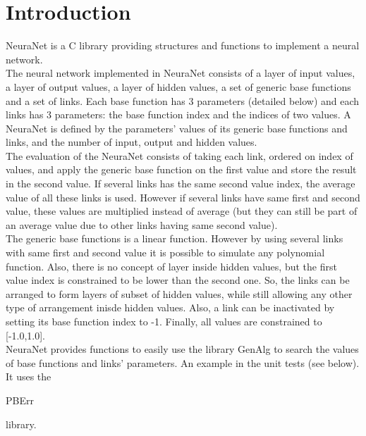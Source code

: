 \section*{Introduction}

NeuraNet is a C library providing structures and functions to implement a neural network.\\ 

The neural network implemented in NeuraNet consists of a layer of input values, a layer of output values, a layer of hidden values, a set of generic base functions and a set of links. Each base function has 3 parameters (detailed below) and each links has 3 parameters: the base function index and the indices of two values. A NeuraNet is defined by the parameters' values of its generic base functions and links, and the number of input, output and hidden values.\\

The evaluation of the NeuraNet consists of taking each link, ordered on index of values, and apply the generic base function on the first value and store the result in the second value. If several links has the same second value index, the average value of all these links is used. However if several links have same first and second value, these values are multiplied instead of average (but they can still be part of an average value due to other links having same second value).\\

The generic base functions is a linear function. However by using several links with same first and second value it is possible to simulate any polynomial function. Also, there is no concept of layer inside hidden values, but the first value index is constrained to be lower than the second one. So, the links can be arranged to form layers of subset of hidden values, while still allowing any other type of arrangement inisde hidden values. Also, a link can be inactivated by setting its base function index to -1. Finally, all values are constrained to [-1.0,1.0].\\

NeuraNet provides functions to easily use the library GenAlg to search the values of base functions and links' parameters. An example in the unit tests (see below).\\

It uses the \begin{ttfamily}PBErr\end{ttfamily} library.\\

